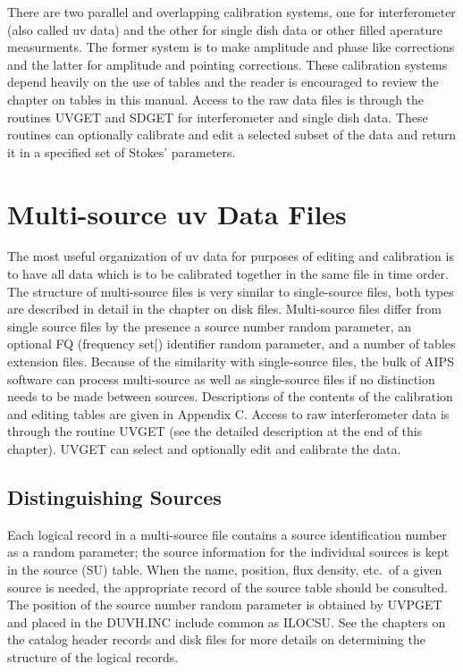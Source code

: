 There are two parallel and overlapping calibration systems, one for
interferometer (also called uv data) and the other for single dish
data or other filled aperature measurments.  The former system is to
make amplitude and phase like corrections and the latter for amplitude
and pointing corrections.  These calibration systems depend heavily on
the use of tables and the reader is encouraged to review the chapter
on tables in this manual.  Access to the raw data files is through the
routines UVGET and SDGET for interferometer
and single dish data.  These routines can optionally calibrate and
edit a selected subset of the data and return it in a specified set of
Stokes' parameters.

\section{Multi-source uv Data Files }
The most useful organization of uv data for purposes of editing and
calibration is to have all data which is to be calibrated together in
the same file in time order.  The structure of multi-source files is
very similar to single-source files, both types are described in
detail in the chapter on disk files.  Multi-source files differ from
single source files by the presence a source number random parameter,
an optional FQ (frequency set[) identifier random parameter, and a
number of tables extension files.  Because of the similarity with
single-source files, the bulk of AIPS software can process
multi-source as well as single-source files if no distinction needs to
be made between sources.  Descriptions of the contents of the
calibration and editing tables are given in Appendix C.  Access to raw
interferometer data is through the routine UVGET (see the
detailed description at the end of this chapter).  UVGET can select
and optionally edit and calibrate the data.

\subsection{Distinguishing Sources }
Each logical record in a multi-source file contains a source
identification number as a random parameter; the source information
for the individual sources is kept in the source (SU) table.  When the
name, position, flux density, etc.~of a given source is needed, the
appropriate record of the source table should be consulted.  The
position of the source number random parameter is obtained by
UVPGET and placed in the DUVH.INC include common as
ILOCSU.  See the chapters on the catalog header records and disk files
for more details on determining the structure of the logical records.

